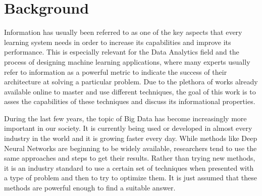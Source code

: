\section{Background}
Information has usually been referred to as one of the key aspects that every learning system needs in order to increase its capabilities and improve its performance. This is especially relevant for the Data Analytics field and the process of designing machine learning applications, where many experts usually refer to information as a powerful metric to indicate the success of their architecture at solving a particular problem. Due to the plethora of works already available online to master and use different techniques, the goal of this work is to asses the capabilities of these techniques and discuss its informational properties. 


During the last few years, the topic of Big Data has become increasingly more important in our society. It is currently being used or developed in almost every industry in the world \cite{article_Big_Data} and it is growing faster every day. While methods like Deep Neural Networks are beginning to be  widely available,  researchers tend to use the same approaches and steps to get their results. Rather than trying new methods, it is an industry standard to use a certain set of techniques when presented with a type of problem and then to try to optimize them. It is just assumed that these methods are powerful enough to find a suitable answer. 

